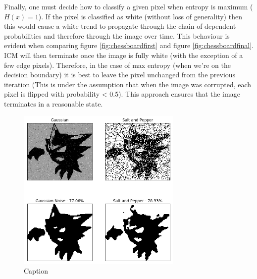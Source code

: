 \documentclass[10pt, a4paper, twocolumn]{article} %
\begin{document}
Finally, one must decide how to classify a given pixel when entropy is maximum ($H(x) = 1$). If the pixel is classified as white (without loss of generality) then this would cause a white trend to propagate through the chain of dependent probabilities and therefore through the image over time. This behaviour is evident when comparing figure \ref{fig:chessboardfirst} and figure \ref{fig:chessboardfinal}. ICM will then terminate once the image is fully white (with the exception of a few edge pixels). Therefore, in the case of max entropy (when we're on the decision boundary) it is best to leave the pixel unchanged from the previous iteration (This is under the assumption that when the image was corrupted, each pixel is flipped with probability < 0.5). This approach ensures that the image terminates in a reasonable state.


\begin{figure}[H]
    \centering
    \qquad
    \caption{}
    \label{fig:chessboard}%
\end{figure}

\begin{figure}
    \centering
    \includegraphics[width = 80mm]{images/ICMFinal.png}
    \caption{Caption}
    \label{fig:ICMfinal}
\end{figure}
\end{document}
